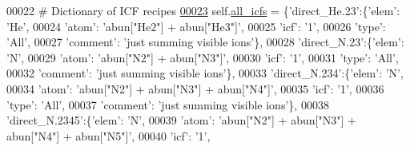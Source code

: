 \begin{DoxyCode}
00022         \textcolor{comment}{# Dictionary of ICF recipes}
\hypertarget{icf_8py_source_l00023}{}\hyperlink{classpyneb_1_1core_1_1icf_1_1_i_c_f_a854ee87a53feb102e429e902227ce88b}{00023}         self.\hyperlink{classpyneb_1_1core_1_1icf_1_1_i_c_f_a854ee87a53feb102e429e902227ce88b}{all\_icfs} = \{\textcolor{stringliteral}{'direct\_He.23'}:\{\textcolor{stringliteral}{'elem'}: \textcolor{stringliteral}{'He'},
00024                                        \textcolor{stringliteral}{'atom'}: \textcolor{stringliteral}{'abun["He2"] + abun["He3"]'},
00025                                        \textcolor{stringliteral}{'icf'}: \textcolor{stringliteral}{'1'},
00026                                        \textcolor{stringliteral}{'type'}: \textcolor{stringliteral}{'All'},
00027                                        \textcolor{stringliteral}{'comment'}: \textcolor{stringliteral}{'just summing visible ions'}\},
00028                          \textcolor{stringliteral}{'direct\_N.23'}:\{\textcolor{stringliteral}{'elem'}: \textcolor{stringliteral}{'N'},
00029                                        \textcolor{stringliteral}{'atom'}: \textcolor{stringliteral}{'abun["N2"] + abun["N3"]'},
00030                                        \textcolor{stringliteral}{'icf'}: \textcolor{stringliteral}{'1'},
00031                                        \textcolor{stringliteral}{'type'}: \textcolor{stringliteral}{'All'},
00032                                        \textcolor{stringliteral}{'comment'}: \textcolor{stringliteral}{'just summing visible ions'}\},
00033                          \textcolor{stringliteral}{'direct\_N.234'}:\{\textcolor{stringliteral}{'elem'}: \textcolor{stringliteral}{'N'},
00034                                        \textcolor{stringliteral}{'atom'}: \textcolor{stringliteral}{'abun["N2"] + abun["N3"] + abun["N4"]'},
00035                                        \textcolor{stringliteral}{'icf'}: \textcolor{stringliteral}{'1'},
00036                                        \textcolor{stringliteral}{'type'}: \textcolor{stringliteral}{'All'},
00037                                        \textcolor{stringliteral}{'comment'}: \textcolor{stringliteral}{'just summing visible ions'}\},
00038                          \textcolor{stringliteral}{'direct\_N.2345'}:\{\textcolor{stringliteral}{'elem'}: \textcolor{stringliteral}{'N'},
00039                                        \textcolor{stringliteral}{'atom'}: \textcolor{stringliteral}{'abun["N2"] + abun["N3"] + abun["N4"] + abun["N5"]'},
00040                                        \textcolor{stringliteral}{'icf'}: \textcolor{stringliteral}{'1'},

\end{DoxyCode}
